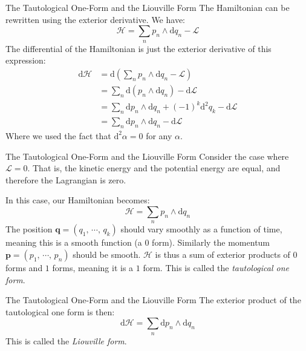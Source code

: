 \documentclass{beamer}
\begin{document}
    \begin{frame}{The Tautological One-Form and the Liouville Form}
        The Hamiltonian can be rewritten using the exterior derivative. We have:
        \[
            \mathcal{H}
            =\sum_{n}p_{n}\land\textrm{d}q_{n}-\mathcal{L}
        \]
        The differential of the Hamiltonian is just the exterior derivative of
        this expression:
        \[
            \begin{aligned}
                \textrm{d}\mathcal{H}
                &=\textrm{d}\left(
                    \sum_{n}p_{n}\land\textrm{d}q_{n}-\mathcal{L}
                \right)\\
                &=\sum_{n}\textrm{d}\left(
                    p_{n}\land\textrm{d}q_{n}
                \right)-\textrm{d}\mathcal{L}\\
                &=\sum_{n}
                    \textrm{d}p_{n}\land\textrm{d}q_{n}
                    +(-1)^{k}\textrm{d}^{2}q_{k}
                    -\textrm{d}\mathcal{L}\\
                    &=\sum_{n}
                    \textrm{d}p_{n}\land\textrm{d}q_{n}
                    -\textrm{d}\mathcal{L}
            \end{aligned}
        \]
        Where we used the fact that $\textrm{d}^{2}\alpha=0$ for any $\alpha$.
    \end{frame}
    \begin{frame}{The Tautological One-Form and the Liouville Form}
        Consider the case where $\mathcal{L}=0$. That is, the kinetic energy and
        the potential energy are equal, and therefore the Lagrangian is zero.
        \par\hfill\par
        In this case, our Hamiltonian becomes:
        \[
            \mathcal{H}
            =\sum_{n}p_{n}\land\textrm{d}q_{n}
        \]
        The position $\mathbf{q}=(q_{1},\,\cdots,\,q_{k})$ should vary smoothly
        as a function of time, meaning this is a smooth function (a 0 form).
        Similarly the momentum $\mathbf{p}=(p_{1},\,\cdots,\,p_{n})$ should be
        smooth. $\mathcal{H}$ is thus a sum of exterior products of $0$ forms
        and $1$ forms, meaning it is a $1$ form. This is called the
        \textit{tautological one form}.
    \end{frame}
    \begin{frame}{The Tautological One-Form and the Liouville Form}
        The exterior product of the tautological one form is then:
        \[
            \textrm{d}\mathcal{H}
            =\sum_{n}\textrm{d}p_{n}\land\textrm{d}q_{n}
        \]
        This is called the \textit{Liouville form}.
    \end{frame}
\end{document}
